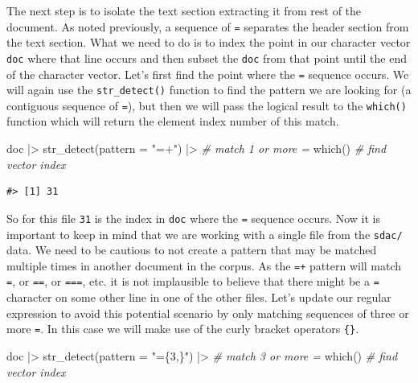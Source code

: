 \documentclass[
  letterpaper,
]{scrbook}
\newenvironment{Shaded}{\begin{snugshade}}{\end{snugshade}}
\newcommand{\AttributeTok}[1]{\textcolor[rgb]{0.00,0.00,0.00}{#1}}
\newcommand{\CommentTok}[1]{\textcolor[rgb]{0.00,0.00,0.00}{\textit{#1}}}
\newcommand{\FunctionTok}[1]{\textcolor[rgb]{0.00,0.00,0.00}{#1}}
\newcommand{\NormalTok}[1]{\textcolor[rgb]{0.00,0.00,0.00}{#1}}
\newcommand{\SpecialCharTok}[1]{\textcolor[rgb]{0.00,0.00,0.00}{#1}}
\newcommand{\StringTok}[1]{\textcolor[rgb]{0.00,0.00,0.00}{#1}}
\begin{document}
The next step is to isolate the text section extracting it from rest of
the document. As noted previously, a sequence of \texttt{=} separates
the header section from the text section. What we need to do is to index
the point in our character vector \texttt{doc} where that line occurs
and then subset the \texttt{doc} from that point until the end of the
character vector. Let's first find the point where the \texttt{=}
sequence occurs. We will again use the \texttt{str\_detect()} function
to find the pattern we are looking for (a contiguous sequence of
\texttt{=}), but then we will pass the logical result to the
\texttt{which()} function which will return the element index number of
this match.

\begin{Shaded}
\begin{Highlighting}[]
\NormalTok{doc }\SpecialCharTok{|\textgreater{}} 
  \FunctionTok{str\_detect}\NormalTok{(}\AttributeTok{pattern =} \StringTok{"=+"}\NormalTok{) }\SpecialCharTok{|\textgreater{}} \CommentTok{\# match 1 or more \textasciigrave{}=\textasciigrave{}}
  \FunctionTok{which}\NormalTok{() }\CommentTok{\# find vector index}
\end{Highlighting}
\end{Shaded}

\begin{verbatim}
#> [1] 31
\end{verbatim}

So for this file \texttt{31} is the index in \texttt{doc} where the
\texttt{=} sequence occurs. Now it is important to keep in mind that we
are working with a single file from the \texttt{sdac/} data. We need to
be cautious to not create a pattern that may be matched multiple times
in another document in the corpus. As the \texttt{=+} pattern will match
\texttt{=}, or \texttt{==}, or \texttt{===}, etc. it is not implausible
to believe that there might be a \texttt{=} character on some other line
in one of the other files. Let's update our regular expression to avoid
this potential scenario by only matching sequences of three or more
\texttt{=}. In this case we will make use of the curly bracket operators
\texttt{\{\}}.

\begin{Shaded}
\begin{Highlighting}[]
\NormalTok{doc }\SpecialCharTok{|\textgreater{}} 
  \FunctionTok{str\_detect}\NormalTok{(}\AttributeTok{pattern =} \StringTok{"=\{3,\}"}\NormalTok{) }\SpecialCharTok{|\textgreater{}} \CommentTok{\# match 3 or more \textasciigrave{}=\textasciigrave{}}
  \FunctionTok{which}\NormalTok{() }\CommentTok{\# find vector index}
\end{Highlighting}
\end{Shaded}
\end{document}
